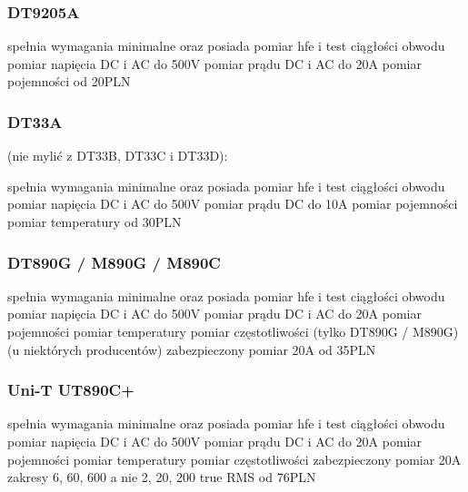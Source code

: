 \subsubsection{DT9205A}
	\begin{itemize}
		\zaleta spełnia wymagania minimalne oraz posiada pomiar hfe i test ciągłości obwodu
		\zaleta pomiar napięcia DC i AC do 500V
		\zaleta pomiar prądu DC i AC do 20A
		\zaleta pomiar pojemności
		\info od 20PLN
	\end{itemize}

\subsubsection{DT33A} (nie mylić z DT33B, DT33C i DT33D):
	\begin{itemize}
		\zaleta spełnia wymagania minimalne oraz posiada pomiar hfe i test ciągłości obwodu
		\zaleta pomiar napięcia DC i AC do 500V
		\zaleta pomiar prądu DC do 10A
		\zaleta pomiar pojemności
		\zaleta pomiar temperatury
		\info od 30PLN
	\end{itemize}

\subsubsection{DT890G / M890G / M890C}
	\begin{itemize}
		\zaleta spełnia wymagania minimalne oraz posiada pomiar hfe i test ciągłości obwodu
		\zaleta pomiar napięcia DC i AC do 500V
		\zaleta pomiar prądu DC i AC do 20A
		\zaleta pomiar pojemności
		\zaleta pomiar temperatury
		\zaleta pomiar częstotliwości (tylko DT890G / M890G)
		\zaleta (u niektórych producentów) zabezpieczony pomiar 20A
		\info od 35PLN
	\end{itemize}

\subsubsection{Uni-T UT890C+}
	\begin{itemize}
		\zaleta spełnia wymagania minimalne oraz posiada pomiar hfe i test ciągłości obwodu
		\zaleta pomiar napięcia DC i AC do 500V
		\zaleta pomiar prądu DC i AC do 20A
		\zaleta pomiar pojemności
		\zaleta pomiar temperatury
		\zaleta pomiar częstotliwości
		\zaleta zabezpieczony pomiar 20A
		\zaleta zakresy 6, 60, 600 a nie 2, 20, 200
		\zaleta true RMS
		\info od 76PLN
	\end{itemize}

